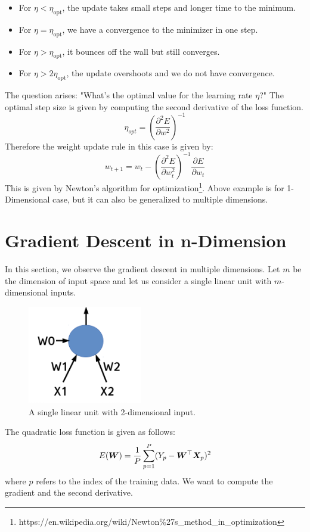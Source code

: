 \begin{itemize}
    \item For $\eta < \eta_{\textrm{opt}}$, the update takes small steps and longer time to the minimum.
    \item For $\eta=\eta_{\textrm{opt}}$, we have a convergence to the minimizer in one step.
    \item For $\eta > \eta_{\textrm{opt}}$, it bounces off the wall but still converges.
    \item For $\eta > 2 \eta_{\textrm{opt}}$, the update overshoots and we do not have convergence.
    
\end{itemize}

The question arises: "What's the optimal value for the learning rate $\eta$?" The optimal step size is given by computing the second derivative of the loss function.
$$ \eta_{opt} = (\frac{\partial^2 E}{\partial w^2})^{-1} $$
Therefore the weight update rule in this case is given by:
$$ w_{t+1} = w_t - (\frac{\partial^2 E}{\partial w_{t}^2})^{-1}\frac{\partial E}{\partial w_t}  $$
This is given by Newton's algorithm for optimization\footnote{https://en.wikipedia.org/wiki/Newton\%27s\_method\_in\_optimization}. Above example is for 1-Dimensional case, but it can also be generalized to multiple dimensions.


\section{Gradient Descent in n-Dimension}

In this section, we observe the gradient descent in multiple dimensions. Let $m$ be the dimension of input space and let us consider a single linear unit with $m$-dimensional inputs.
\begin{figure}[t]
\centering
\includegraphics[width=50mm]{lectures/07-a/su.png}
\caption{A single linear unit with 2-dimensional input.}
\end{figure}
The quadratic loss function is given as follows: 
$$ E(\vect{W})= \frac{1}{P}\sum_{p=1}^P(Y_{p} - \vect{W}^{\top}\vect{X}_{p})^2$$
where $p$ refers to the index of the training data. We want to compute the gradient and the second derivative.

